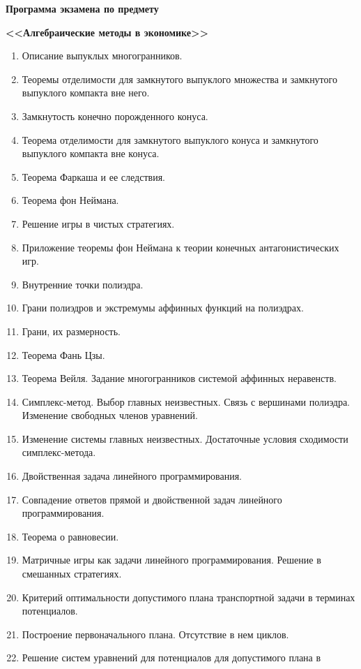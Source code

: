 \begin{center}
	{\Large \textbf{Программа экзамена по предмету}}
	
	{\Large \textbf{<<Алгебраические методы в экономике>>}}
\end{center}

\begin{enumerate}
	\item Описание выпуклых многогранников.
	\item Теоремы отделимости для замкнутого выпуклого множества и замкнутого
	выпуклого компакта вне него.
	\item Замкнутость конечно порожденного конуса.
	\item Теорема отделимости для замкнутого выпуклого конуса и замкнутого выпуклого компакта вне конуса.
	\item Теорема Фаркаша и ее следствия.
	\item Теорема фон Неймана.
	\item Решение игры в чистых стратегиях.
	\item Приложение теоремы фон Неймана к теории конечных антагонистических
	игр.
	\item Внутренние точки полиэдра.
	\item Грани полиэдров и экстремумы аффинных функций на полиэдрах.
	\item Грани, их размерность.
	\item Теорема Фань Цзы.
	\item Теорема Вейля. Задание многогранников системой аффинных неравенств.
	\item Симплекс-метод. Выбор главных неизвестных. Связь с вершинами полиэдра. Изменение свободных членов уравнений.
	\item Изменение системы главных неизвестных. Достаточные условия сходимости симплекс-метода.
	\item Двойственная задача линейного программирования.
	\item Совпадение ответов прямой и двойственной задач линейного программирования.
	\item Теорема о равновесии.
	\item Матричные игры как задачи линейного программирования. Решение в
	смешанных стратегиях.
	\item Критерий оптимальности допустимого плана транспортной задачи в терминах потенциалов.
	\item Построение первоначального плана. Отсутствие в нем циклов.
	\item Решение систем уравнений для потенциалов для допустимого плана в

\end{enumerate}
